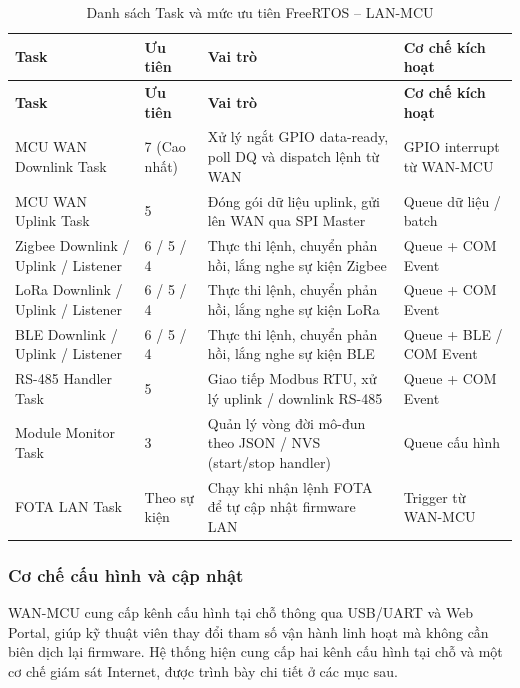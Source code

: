                 \begin{longtable}{|p{}|p{}|p{}|p{}|}
                \caption{Danh sách Task và mức ưu tiên FreeRTOS -- LAN-MCU}
                \label{tab:freertos_lan} \\
                \hline
                \textbf{Task} & \textbf{Ưu tiên} & \textbf{Vai trò} & \textbf{Cơ chế kích hoạt} \\ \hline
                \endfirsthead
                \hline
                \textbf{Task} & \textbf{Ưu tiên} & \textbf{Vai trò} & \textbf{Cơ chế kích hoạt} \\ \hline
                \endhead
                MCU WAN Downlink Task & 7 (Cao nhất) & Xử lý ngắt GPIO data-ready, poll DQ và dispatch lệnh từ WAN & GPIO interrupt từ WAN-MCU \\ \hline
                MCU WAN Uplink Task & 5 & Đóng gói dữ liệu uplink, gửi lên WAN qua SPI Master & Queue dữ liệu / batch \\ \hline
                Zigbee Downlink / Uplink / Listener & 6 / 5 / 4 & Thực thi lệnh, chuyển phản hồi, lắng nghe sự kiện Zigbee & Queue + COM Event \\ \hline
                LoRa Downlink / Uplink / Listener & 6 / 5 / 4 & Thực thi lệnh, chuyển phản hồi, lắng nghe sự kiện LoRa & Queue + COM Event \\ \hline
                BLE Downlink / Uplink / Listener & 6 / 5 / 4 & Thực thi lệnh, chuyển phản hồi, lắng nghe sự kiện BLE & Queue + BLE / COM Event \\ \hline
                RS-485 Handler Task & 5 & Giao tiếp Modbus RTU, xử lý uplink / downlink RS-485 & Queue + COM Event \\ \hline
                Module Monitor Task & 3 & Quản lý vòng đời mô-đun theo JSON / NVS (start/stop handler) & Queue cấu hình \\ \hline
                FOTA LAN Task & Theo sự kiện & Chạy khi nhận lệnh FOTA để tự cập nhật firmware LAN & Trigger từ WAN-MCU \\ \hline
            \end{longtable}
        
        \subsubsection{Cơ chế cấu hình và cập nhật}
        
            WAN-MCU cung cấp kênh cấu hình tại chỗ thông qua USB/UART và Web Portal, giúp kỹ thuật viên thay đổi tham số vận hành linh hoạt mà không cần biên dịch lại firmware. Hệ thống hiện cung cấp hai kênh cấu hình tại chỗ và một cơ chế giám sát Internet, được trình bày chi tiết ở các mục sau.
            
